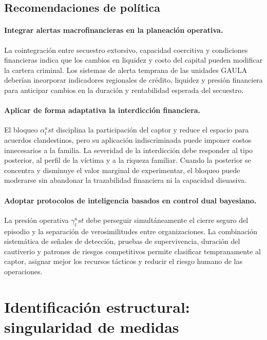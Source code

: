 \documentclass[12pt]{article}
\theoremstyle{definition}
\theoremstyle{remark}
\newcommand{\1}{\mathbf{1}}
\begin{document}
\subsection{Recomendaciones de política}

\paragraph{Integrar alertas macrofinancieras en la planeación operativa.}
La cointegración entre secuestro extorsivo, capacidad coercitiva y condiciones financieras indica que los cambios en liquidez y costo del capital pueden modificar la cartera criminal. Los sistemas de alerta temprana de las unidades GAULA deberían incorporar indicadores regionales de crédito, liquidez y presión financiera para anticipar cambios en la duración y rentabilidad esperada del secuestro.

\paragraph{Aplicar de forma adaptativa la interdicción financiera.}
El bloqueo $\alpha_t^ast$ disciplina la participación del captor y reduce el espacio para acuerdos clandestinos, pero su aplicación indiscriminada puede imponer costos innecesarios a la familia. La severidad de la interdicción debe responder al tipo posterior, al perfil de la víctima y a la riqueza familiar. Cuando la posterior se concentra y disminuye el valor marginal de experimentar, el bloqueo puede moderarse sin abandonar la trazabilidad financiera ni la capacidad disuasiva.

\paragraph{Adoptar protocolos de inteligencia basados en control dual bayesiano.}
La presión operativa $\gamma_t^ast$ debe perseguir simultáneamente el cierre seguro del episodio y la separación de verosimilitudes entre organizaciones. La combinación sistemática de señales de detección, pruebas de supervivencia, duración del cautiverio y patrones de riesgos competitivos permite clasificar tempranamente al captor, asignar mejor los recursos tácticos y reducir el riesgo humano de las operaciones.


\section{Identificación estructural: singularidad de medidas}
\label{app:general-id}
\end{document}
